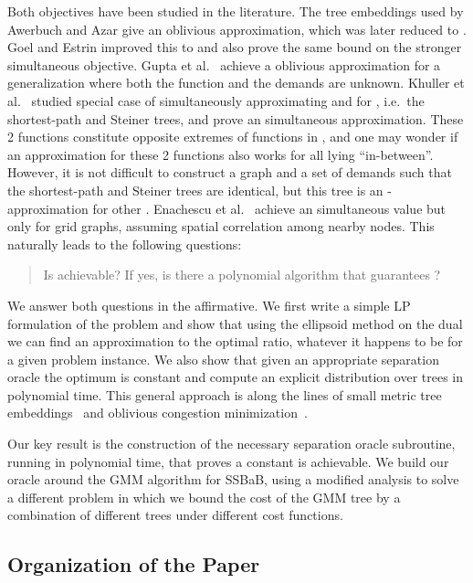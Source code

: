 \documentclass[11pt]{article}
\begin{document}
Both objectives have been studied in the literature.  The tree embeddings used by Awerbuch and Azar
\cite{awerbuch1997bbn} give an  oblivious approximation,
which was later reduced to  \cite{bartal1998aam,
fakcharoenphol2003tba}.  Goel and Estrin \cite{goel2003soc} improved this to
 and also prove the same bound on the stronger
simultaneous objective.  Gupta et al.\ \cite{gupta2006ond} achieve a
 oblivious approximation for a generalization where
both the function and the demands are unknown.  Khuller et al.\
\cite{khuller1995bms} studied special case of simultaneously approximating
 and  for , i.e.\ the shortest-path and Steiner
trees, and prove an  simultaneous approximation.  These 2 functions
constitute opposite extremes of functions in , and one may wonder
if an  approximation for these 2 functions also works for all  lying ``in-between''.  However, it is not difficult to construct
a graph and a set of demands such that the shortest-path and Steiner trees are
identical, but this tree is an -approximation for other .  Enachescu et al.\ \cite{enachescu2005sfa} achieve an 
simultaneous value but only for grid graphs, assuming spatial
correlation among nearby nodes. This naturally leads to the following questions:

\begin{quote}
Is  achievable? If yes, is there a polynomial algorithm that
guarantees ?
\end{quote}

We answer both questions in the affirmative. We first write a simple LP
formulation of the problem and show that using the ellipsoid method on the
dual we can find an  approximation to the optimal ratio, whatever it
happens to be for a given problem instance. We also show that given an
appropriate separation oracle the optimum is constant and compute an explicit
distribution over  trees in polynomial time. This general
approach is along the lines of small metric tree embeddings~\cite{ccggp:tree98} and
oblivious congestion minimization~\cite{h:congestion08}.

Our key result is the construction of the necessary separation oracle
subroutine, running in polynomial time, that proves a constant is achievable.
We build our oracle around the GMM algorithm for SSBaB, using a modified
analysis to solve a different problem in which we bound the cost of the GMM
tree by a combination of different trees under different cost functions. 
\subsection{Organization of the Paper}
\end{document}
